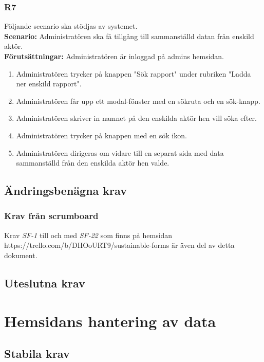 \documentclass{article}
\begin{document}
         \subsubsection*{R7}
    Följande scenario ska stödjas av systemet.
        \\
       \indent \textbf{Scenario:} Administratören ska få tillgång till sammanställd datan från enskild aktör.
        \\
       \indent \textbf{Förutsättningar:} Administratören är inloggad på admins hemsidan.
            \begin{enumerate}
                \item Administratören trycker på knappen "Sök rapport" under rubriken "Ladda ner enskild rapport".
                \item Administratören får upp ett modal-fönster med en sökruta och en sök-knapp.
                \item Administratören skriver in namnet på den enskilda aktör hen vill söka efter.
                \item Administratören trycker på knappen med en sök ikon.
                \item  Administratören dirigeras om vidare till en separat sida med data sammanställd från den enskilda aktör hen valde.
            \end{enumerate}
            

\subsection*{Ändringsbenägna krav}

\subsubsection*{Krav från scrumboard}
Krav \textit{SF-1} till och med \textit{SF-22} som finns på hemsidan https://trello.com/b/DHOoURT9/sustainable-forms är även del av detta dokument.


    \subsection*{Uteslutna krav}
    
    \newpage
     \section{Hemsidans hantering av data}
    
    \subsection*{Stabila krav}
\end{document}
